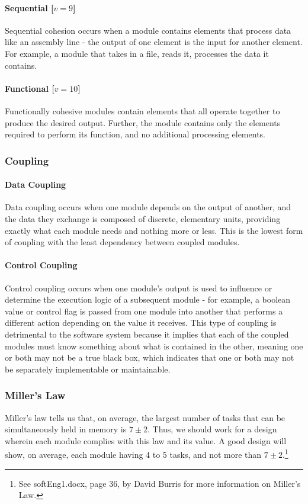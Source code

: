 \documentclass{article}
\begin{document}
			\paragraph{Sequential [$v=9$]} Sequential cohesion occurs when a module contains elements that process data like an assembly line - the output of one element is the input for another element. For example, a module that takes in a file, reads it, processes the data it contains. 
			\paragraph{Functional [$v=10$]} Functionally cohesive modules contain elements that all operate together to produce the desired output. Further, the module contains only the elements required to perform its function, and no additional processing elements.
			
		\subsubsection{Coupling}
			\paragraph{Data Coupling}
				Data coupling occurs when one module depends on the output of another, and the data they exchange is composed of discrete, elementary units, providing exactly what each module needs and nothing more or less. This is the lowest form of coupling with the least dependency between coupled modules. 
			\paragraph{Control Coupling}
				Control coupling occurs when one module's output is used to influence or determine the execution logic of a subsequent module - for example, a boolean value or control flag is passed from one module into another that performs a different action depending on the value it receives. This type of coupling is detrimental to the software system because it implies that each of the coupled modules must know something about what is contained in the other, meaning one or both may not be a true black box, which indicates that one or both may not be separately implementable or maintainable. 
		\subsubsection{Miller's Law}
			Miller's law tells us that, on average, the largest number of tasks that can be simultaneously held in memory is $7\pm2$. Thus, we should work for a design wherein each module complies with this law and its value. A good design will show, on average, each module having 4 to 5 tasks, and not more than $7\pm2$.\footnote{See softEng1.docx, page 36, by David Burris for more information on Miller's Law.}  
\end{document}
